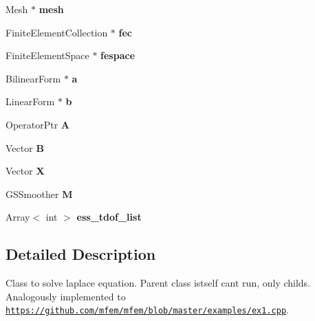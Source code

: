 \begin{DoxyCompactItemize}
Mesh $\ast$ {\bfseries mesh}
\item 
\mbox{\label{classFiniteElementeBase_a69a18f1e5f57ed3aaa01abe40962d059}} 
Finite\+Element\+Collection $\ast$ {\bfseries fec}
\item 
\mbox{\label{classFiniteElementeBase_af2f045aa62007d632ddac54ccecb8f7a}} 
Finite\+Element\+Space $\ast$ {\bfseries fespace}
\item 
\mbox{\label{classFiniteElementeBase_a7b4469156230281c1dcfaa440eb58d92}} 
Bilinear\+Form $\ast$ {\bfseries a}
\item 
\mbox{\label{classFiniteElementeBase_a475862c154248228908de08499e67de0}} 
Linear\+Form $\ast$ {\bfseries b}
\item 
\mbox{\label{classFiniteElementeBase_a9577bdbdb32662095d3d42865829a32f}} 
Operator\+Ptr {\bfseries A}
\item 
\mbox{\label{classFiniteElementeBase_a05338aab755f3c4e68f82d9cd4c42ccc}} 
Vector {\bfseries B}
\item 
\mbox{\label{classFiniteElementeBase_a397e8adff87d82c58905df0162e8cdd8}} 
Vector {\bfseries X}
\item 
\mbox{\label{classFiniteElementeBase_aaaf65fe06be3766f539f0cc4616b7277}} 
G\+S\+Smoother {\bfseries M}
\item 
\mbox{\label{classFiniteElementeBase_a3d4eb8b924a21d426f0b07622f0e21eb}} 
Array$<$ int $>$ {\bfseries ess\+\_\+tdof\+\_\+list}
\end{DoxyCompactItemize}


\subsection{Detailed Description}
Class to solve laplace equation. Parent class istself cant run, only childs. Analogously implemented to \href{https://github.com/mfem/mfem/blob/master/examples/ex1.cpp}{\tt https\+://github.\+com/mfem/mfem/blob/master/examples/ex1.\+cpp}. 

